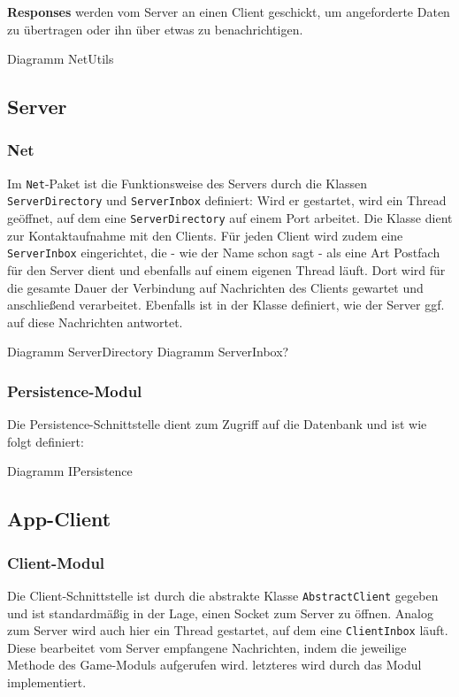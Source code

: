 \textbf{Responses} werden vom Server an einen Client geschickt, um angeforderte Daten zu übertragen oder ihn über etwas zu benachrichtigen. 

Diagramm NetUtils

\subsection{Server}
\subsubsection{Net}
Im \texttt{Net}-Paket ist die Funktionsweise des Servers durch die Klassen \texttt{ServerDirectory} und \texttt{ServerInbox} definiert: Wird er gestartet, wird ein Thread geöffnet, auf dem eine \texttt{ServerDirectory} auf einem Port arbeitet. Die Klasse dient zur Kontaktaufnahme mit den Clients. Für jeden Client wird zudem eine \texttt{ServerInbox} eingerichtet, die - wie der Name schon sagt - als eine Art Postfach für den Server dient und ebenfalls auf einem eigenen Thread läuft. Dort wird für die gesamte Dauer der Verbindung auf Nachrichten des Clients gewartet und anschließend verarbeitet. Ebenfalls ist in der Klasse definiert, wie der Server ggf. auf diese Nachrichten antwortet.

Diagramm ServerDirectory
Diagramm ServerInbox?

\subsubsection{Persistence-Modul}
Die Persistence-Schnittstelle dient zum Zugriff auf die Datenbank und ist wie folgt definiert:

Diagramm IPersistence

\subsection{App-Client}
\subsubsection{Client-Modul}
Die Client-Schnittstelle ist durch die abstrakte Klasse \texttt{AbstractClient} gegeben und ist standardmäßig in der Lage, einen Socket zum Server zu öffnen. Analog zum Server wird auch hier ein Thread gestartet, auf dem eine \texttt{ClientInbox} läuft. Diese bearbeitet vom Server empfangene Nachrichten, indem die jeweilige Methode des Game-Moduls aufgerufen wird. letzteres wird durch das Modul implementiert.

